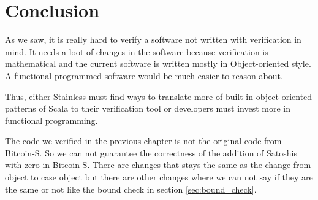 \chapter{Conclusion}
\label{chap:conclusion}

As we saw, it is really hard to verify a software not written with verification in mind.
It needs a loot of changes in the software because verification is mathematical and the current software is written mostly in Object-oriented style.
A functional programmed software would be much easier to reason about.

Thus, either Stainless must find ways to translate more of built-in object-oriented patterns of Scala to their verification tool or developers must invest more in functional programming.

The code we verified in the previous chapter is not the original code from Bitcoin-S.
So we can not guarantee the correctness of the addition of Satoshis with zero in Bitcoin-S.
There are changes that stays the same as the change from object to case object but there are other changes where we can not say if they are the same or not like the bound check in section \ref{sec:bound_check}.
